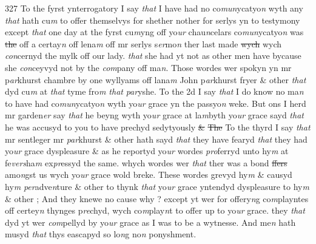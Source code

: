 \documentclass[12pt, a4paper]{book}
\begin{document}
{\color{Mahogany}327} 
				\marginpar[\vspace{0.5cm}{\textcolor{Gray}{1}}]{}
			 To the fyrst ynterrogatory I say \textit{that} I have had no co\textit{mun}ycatyo\textit{n} wyth any \textit{that} hath cu\textit{m} to offer themselvys for shether nother for serlys yn to testymony except \textit{that} one day at the fyrst cu\textit{m}yng off yo\textit{ur} chau\textit{n}celars co\textit{mun}ycatyo\textit{n} was \sout{the }off a certay\textit{n} off lena\textit{m} off mr serlys s\textit{er}mo\textit{n} ther last made \sout{wych} wych \textit{con}cernyd the mylk off our lady. \textit{that} she had yt not as other men have bycause she \textit{con}ceyvyd not by the \textit{com}pany off ma\textit{n}. Those wordes wer spokyn yn mr p\textit{ar}khurst chambre by one wyllyams off lana\textit{m} John p\textit{ar}khurst fryer \&  other \textit{that} dyd cu\textit{m} at \textit{that} tyme fro\textit{m that}
               \textit{par}yshe.  
				\marginpar[\vspace{0.5cm}{\textcolor{Gray}{2}}]{}
			 To the 2d I say \textit{that} I do know no ma\textit{n} to have had co\textit{mun}ycatyo\textit{n} wyth yo\textit{ur} grace yn the passyo\textit{n}  weke. But ons I herd mr garden\textit{er} say \textit{that} he beyng wyth yo\textit{ur} grace at la\textit{m}byth yo\textit{ur} grace sayd \textit{that} he was accusyd to you to have prechyd sedytyously \sout{\& }  
				\marginpar[\vspace{0.5cm}{\textcolor{Gray}{3}}]{}
			 \sout{The }To the thyrd I say \textit{that} mr sentleger mr \textit{par}khurst \& other hath sayd \textit{that} they have fearyd \textit{that} they had yo\textit{ur} grace dyspleasure \& as he reportyd yo\textit{ur} wordes \textit{pro}ferryd unto hy\textit{m} at fe\textit{vers}ha\textit{m} ex\textit{pr}essyd the same. whych wordes wer \textit{that} ther was a bond \sout{ffers} amo\textit{n}gst us wych yo\textit{ur} grace wold breke. These wordes grevyd hy\textit{m} \& causyd hy\textit{m}
               \textit{per}adve\textit{n}ture \& other to thynk \textit{that} yo\textit{ur} grace yntendyd dyspleasure to hy\textit{m} \& other ; And they knewe  no cause why ? except yt wer for offery\textit{n}g co\textit{m}playntes off certey\textit{n} thynges p\textit{re}chyd, wych co\textit{m}play\textit{n}t to offer up to yo\textit{ur} grace. they \textit{that} dyd yt wer \textit{com}pellyd by yo\textit{ur} grace as I was to be a wytnesse. And me\textit{n} hath musyd \textit{that} thys eascapyd so lo\textit{n}g no\textit{n} ponyshment.  
				\marginpar[\vspace{0.5cm}{\textcolor{Gray}{4}}]{}
\end{document}
